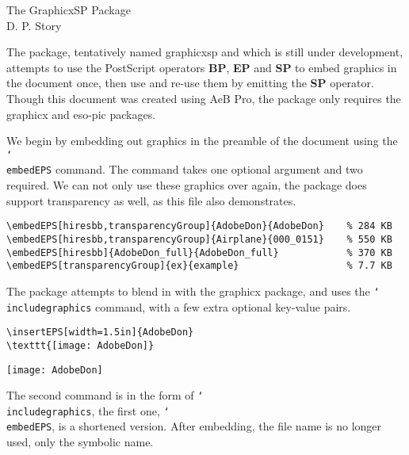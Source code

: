 \documentclass{article}
\newcommand{\cs}[1]{\texttt{\char`\\#1}}
\begin{document}
\begin{center}
The GraphicxSP Package\\
D. P. Story
\end{center}

The package, tentatively named \textsf{graphicxsp} and which is still under development,
attempts to use the PostScript operators \textbf{BP}, \textbf{EP} and \textbf{SP} to embed
graphics in the document once, then use and re-use them by emitting the \textbf{SP} operator.
Though this document was created using \textsf{AeB Pro}, the package only requires
the \textsf{graphicx} and \textsf{eso-pic} packages.

\medskip
We begin by embedding out graphics in the preamble of the document using the
\cs{embedEPS} command. The command takes one optional argument and two required. We can
not only use these graphics over again, the package does support transparency as well, as
this file also demonstrates.
\begin{small}
\begin{verbatim}
\embedEPS[hiresbb,transparencyGroup]{AdobeDon}{AdobeDon}    % 284 KB
\embedEPS[hiresbb,transparencyGroup]{Airplane}{000_0151}    % 550 KB
\embedEPS[hiresbb]{AdobeDon_full}{AdobeDon_full}            % 370 KB
\embedEPS[transparencyGroup]{ex}{example}                   % 7.7 KB
\end{verbatim}
\end{small}



The package attempts to blend in with the \textsf{graphicx} package, and uses
the \cs{includegraphics} command, with a few extra optional key-value
pairs.
\begin{small}%
\begin{verbatim}
\insertEPS[width=1.5in]{AdobeDon}
\texttt{[image: AdobeDon]}
\end{verbatim}
\end{small}%



\begin{center}
\texttt{[image: AdobeDon]}
\end{center}
The second command is in the form of \cs{includegraphics}, the first
one, \cs{embedEPS}, is a shortened version. After embedding, the file name is no longer used,
only the symbolic name.
\end{document}

